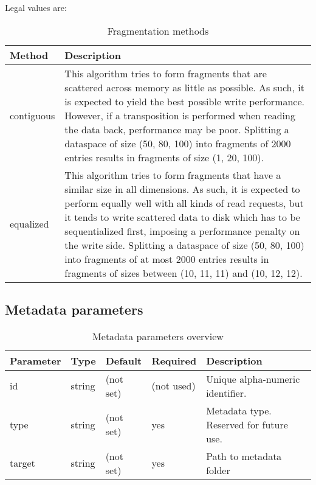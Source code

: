 Legal values are:

\begin{preserve}
\begin{table}[!ht]
  \begin{center}
    \begin{tabularx}{\textwidth}{lX}
      Method     & Description \\
      \hline
      contiguous  & This algorithm tries to form fragments that are scattered across memory as little as possible. As such, it is expected to yield the best possible write performance. 
      However, if a transposition is performed when reading the data back, performance may be poor.
      Splitting a dataspace of size (50, 80, 100) into fragments of 2000 entries results in fragments of size (1, 20, 100). \\
      equalized   & This algorithm tries to form fragments that have a similar size in all dimensions. As such, it is expected to perform equally well with all kinds of read requests, but it tends to write scattered data to disk which has to be sequentialized first, imposing a performance penalty on the write side.
      Splitting a dataspace of size (50, 80, 100) into fragments of at most 2000 entries results in fragments of sizes between (10, 11, 11) and (10, 12, 12). \\
    \end{tabularx}
  \end{center}
  \caption{Fragmentation methods}%
  \label{tab:frag_methods}
\end{table}
\end{preserve}
\FloatBarrier
\vspace{\gapsize}

\subsection{Metadata parameters}

\begin{preserve}
\begin{table}[!ht]
  \begin{center}
    \begin{tabularx}{\textwidth}{llllX}
      Parameter & Type   & Default   & Required   & Description                             \\ 
      \hline
      id        & string & (not set) & (not used) & Unique alpha-numeric identifier.        \\ 
      type      & string & (not set) & yes        & Metadata type. Reserved for future use. \\ 
      target    & string & (not set) & yes        & Path to metadata folder                 \\ 
    \end{tabularx}
  \end{center}
  \caption{Metadata parameters overview}%
  \label{tab:metadata_params}
\end{table}
\end{preserve}

